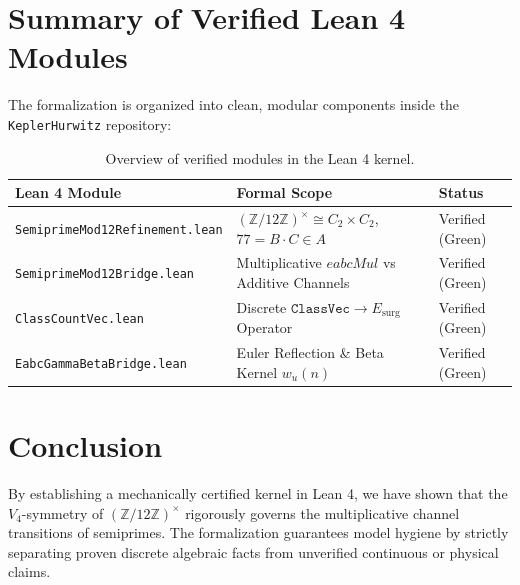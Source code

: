 \documentclass[11pt,a4paper]{article}
\theoremstyle{definition}
\begin{document}
	\section{Summary of Verified Lean 4 Modules}
	
	The formalization is organized into clean, modular components inside the \texttt{KeplerHurwitz} repository:
	
	\begin{table}[h]
		\centering
		\small
		\begin{tabular}{lll}
			\toprule
			\textbf{Lean 4 Module} & \textbf{Formal Scope} & \textbf{Status} \\
			\midrule
			\texttt{SemiprimeMod12Refinement.lean} & $(\mathbb{Z}/12\mathbb{Z})^\times \cong C_2 \times C_2$, $77 = B \cdot C \in A$ & Verified (Green) \\
			\texttt{SemiprimeMod12Bridge.lean} & Multiplicative $eabcMul$ vs Additive Channels & Verified (Green) \\
			\texttt{ClassCountVec.lean} & Discrete $\mathtt{ClassVec} \to E_{\mathrm{surg}}$ Operator & Verified (Green) \\
			\texttt{EabcGammaBetaBridge.lean} & Euler Reflection \& Beta Kernel $w_u(n)$ & Verified (Green) \\
			\bottomrule
		\end{tabular}
		\caption{Overview of verified modules in the Lean 4 kernel.}
	\end{table}
	
	\section{Conclusion}
	
	By establishing a mechanically certified kernel in Lean 4, we have shown that the $V_4$-symmetry of $(\mathbb{Z}/12\mathbb{Z})^\times$ rigorously governs the multiplicative channel transitions of semiprimes. The formalization guarantees model hygiene by strictly separating proven discrete algebraic facts from unverified continuous or physical claims.
	
\end{document}
